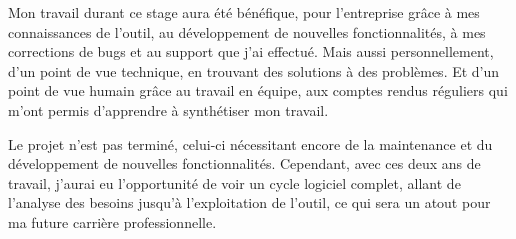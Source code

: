 
Mon travail durant ce stage aura été bénéfique, pour l'entreprise grâce à mes connaissances de l'outil, 
au développement de nouvelles fonctionnalités, à mes corrections de bugs et au support que j'ai effectué. Mais aussi
personnellement, d'un point de vue technique, en trouvant des solutions à des problèmes. Et d'un
point de vue humain grâce au travail en équipe, aux comptes rendus réguliers qui m'ont permis
d'apprendre à synthétiser mon travail.

Le projet n'est pas terminé, celui-ci nécessitant encore de la maintenance et du développement de nouvelles fonctionnalités. Cependant, avec ces deux ans de travail, j'aurai eu l'opportunité de voir un cycle logiciel complet, allant de l'analyse des besoins jusqu'à l'exploitation de l'outil, ce qui sera un atout pour ma future carrière professionnelle.

